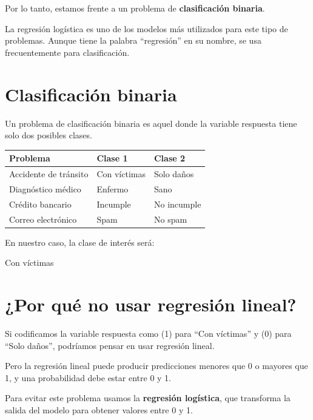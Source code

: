 \documentclass[
  11pt,
  letterpaper,
]{book}
\newenvironment{Shaded}{\begin{snugshade}}{\end{snugshade}}
\newcommand{\NormalTok}[1]{\textcolor[rgb]{0.00,0.23,0.31}{#1}}
\newcounter{none} %
\begin{document}
Por lo tanto, estamos frente a un problema de \textbf{clasificación
binaria}.

La regresión logística es uno de los modelos más utilizados para este
tipo de problemas. Aunque tiene la palabra ``regresión'' en su nombre,
se usa frecuentemente para clasificación.

\section{Clasificación binaria}\label{clasificaciuxf3n-binaria}

Un problema de clasificación binaria es aquel donde la variable
respuesta tiene solo dos posibles clases.

{\def\LTcaptype{none} %
\begin{longtable}[]{@{}lll@{}}
\toprule\noalign{}
Problema & Clase 1 & Clase 2 \\
\midrule\noalign{}
\endhead
\bottomrule\noalign{}
\endlastfoot
Accidente de tránsito & Con víctimas & Solo daños \\
Diagnóstico médico & Enfermo & Sano \\
Crédito bancario & Incumple & No incumple \\
Correo electrónico & Spam & No spam \\
\end{longtable}
}

En nuestro caso, la clase de interés será:

\begin{Shaded}
\begin{Highlighting}[]
\NormalTok{Con víctimas}
\end{Highlighting}
\end{Shaded}

\section{¿Por qué no usar regresión
lineal?}\label{por-quuxe9-no-usar-regresiuxf3n-lineal}

Si codificamos la variable respuesta como (1) para ``Con víctimas'' y
(0) para ``Solo daños'', podríamos pensar en usar regresión lineal.

Pero la regresión lineal puede producir predicciones menores que 0 o
mayores que 1, y una probabilidad debe estar entre 0 y 1.

Para evitar este problema usamos la \textbf{regresión logística}, que
transforma la salida del modelo para obtener valores entre 0 y 1.
\end{document}
